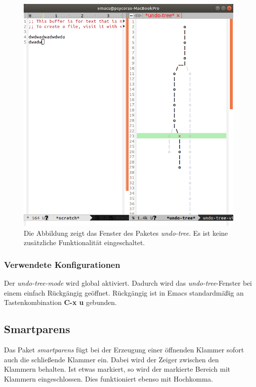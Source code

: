 \begin{figure}[h]
  \centering
  \includegraphics[width=.95\textwidth]{./images/Pakete/undotree.png}
  \caption{\label{fig:undotree} Die Abbildung zeigt das Fenster des
    Paketes \textit{undo-tree}. Es ist keine zusätzliche
    Funktionalität eingeschaltet.}
\end{figure}

\subsubsection{Verwendete Konfigurationen}
Der \textit{undo-tree-mode} wird global aktiviert. Dadurch wird das
\textit{undo-tree}-Fenster bei einem einfach {\glqq}Rückgängig{\grqq}
geöffnet. {\glqq}Rückgängig{\grqq} ist in Emacs standardmäßig an
Tastenkombination \textbf{C-x u} gebunden.\\

\subsection{Smartparens}
\label{subsec:smartparens}
Das Paket \textit{smartparens} fügt bei der Erzeugung einer öffnenden
Klammer sofort auch die schließende Klammer ein. Dabei wird der Zeiger
zwischen den Klammern behalten. Ist etwas markiert, so wird der
markierte Bereich mit Klammern eingeschlossen. Dies funktioniert
ebenso mit Hochkomma. \cite{Smartparens}\\

